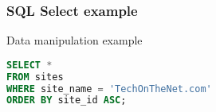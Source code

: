\begin{frame}[fragile]
        \frametitle{SQL Select example}

Data manipulation example
\begin{lstlisting}[language=sql]
SELECT *
FROM sites
WHERE site_name = 'TechOnTheNet.com'
ORDER BY site_id ASC;
\end{lstlisting}

\end{frame}
